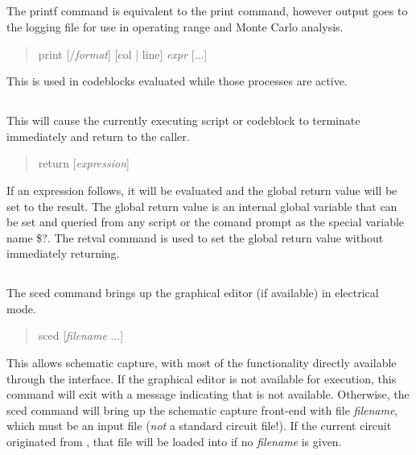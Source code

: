 \subsection{}


The {\cb printf} command is equivalent to the {\cb print} command,
however output goes to the logging file for use in operating range and
Monte Carlo analysis.
\begin{quote}\vt
print [/{\it format\/}] [col | line] {\it expr\/} [...]
\end{quote}
This is used in codeblocks evaluated while those processes are active.

\subsection{}


This will cause the currently executing script or codeblock to
terminate immediately and return to the caller.
\begin{quote}\vt
return [{\it expression\/}]
\end{quote}
If an expression follows, it will be evaluated and the global return
value will be set to the result.  The global return value is an
internal global variable that can be set and queried from any script
or the comand prompt as the special variable name {\vt \$?}.  The {\cb
retval} command is used to set the global return value without
immediately returning.


\subsection{}


The {\cb sced} command brings up the {\Xic} graphical editor (if
available) in electrical mode.
\begin{quote}\vt
sced [{\it filename} ...]
\end{quote}
This allows schematic capture, with most of the {\WRspice}
functionality directly available through the {\Xic} interface.  If the
{\Xic} graphical editor is not available for execution, this command
will exit with a message indicating that {\Xic} is not available. 
Otherwise, the {\cb sced} command will bring up the schematic capture
front-end with file {\it filename\/}, which must be an {\Xic} input
file ({\it not} a standard {\WRspice} circuit file!).  If the current
circuit originated from {\Xic}, that file will be loaded into {\Xic}
if no {\it filename} is given. 

